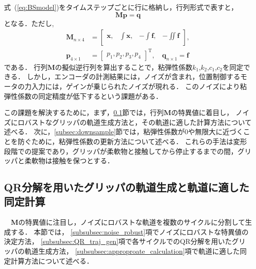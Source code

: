 \documentclass[a4paper]{jarticle}
\begin{document}
式~(\ref{eq:BSmodel})をタイムステップごとに行に格納し，行列形式で表すと，
\begin{equation}
    \mathbf{M}\mathbf{p} = \mathbf{q} 
    \label{eq:Mp_q}
\end{equation}
となる．ただし,
\begin{equation}
    \begin{aligned}
        \mathbf{M}_{n \times 4} &= \begin{bmatrix}
            \boldsymbol{x}, & \int{\boldsymbol{x}}, & -\int{\boldsymbol{f}}, & -\iint{\boldsymbol{f}}\\
        \end{bmatrix}, \\
        \mathbf{p}_{4 \times 1}  &= \begin{bmatrix}
            p_1 ,p_2 ,p_3 ,p_4
        \end{bmatrix}^{\mathrm{T}}, \quad
        \mathbf{q}_{n \times 1}   = \boldsymbol{f}
    \end{aligned}
\label{eq:BSmodel_matrix}
\end{equation}
である．
行列$\mathbf{M}$の擬似逆行列を算出することで，粘弾性係数$k_1$,$k_2$,$c_1$,$c_2$を同定できる．
しかし，エンコーダの計測結果には，ノイズが含まれ，位置制御するモータの力入力には，ゲインが乗じられたノイズが現れる．
このノイズにより粘弾性係数の同定精度が低下するという課題がある．

この課題を解決するために，まず，\ref{subsec:QR_traj_and_calculation}節では，行列$\mathbf{M}$の特異値に着目し，
ノイズにロバストなグリッパの軌道生成方法と，その軌道に適した計算方法について述べる．
次に，\ref{subsec:downsample}節では，粘弾性係数が0や無限大に近づくことを防ぐために，粘弾性係数の更新方法について述べる．
これらの手法は変形段階での提案であり，グリッパが柔軟物と接触してから停止するまでの間，グリッパと柔軟物は接触を保つとする．
\subsection{QR分解を用いたグリッパの軌道生成と軌道に適した同定計算}\label{subsec:QR_traj_and_calculation}
　$\mathbf{M}$の特異値に注目し，ノイズにロバストな軌道を複数のサイクルに分割して生成する．
本節では，
\ref{subsubsec:noise_robust}項でノイズにロバストな特異値の決定方法，
\ref{subsubsec:QR_traj_gen}項で各サイクルでのQR分解を用いたグリッパの軌道生成方法，
\ref{subsubsec:approproate_calculation}項で軌道に適した同定計算方法について述べる．
\end{document}
